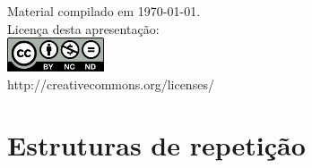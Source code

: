 \documentclass[portuguese,10pt,xcolor=table]{bredelebeamer}
\title{\insertlecture}
\author{Prof. Fernando Figueira\\(adaptado do material do Prof. Rafael Beserra Gomes}
\institute{UFRN}
\date{}
\begin{document}
\begin{frame}
  \maketitle
 \begin{center}
 \tiny
Material compilado em \today.\\
  Licença desta apresentação:\\
		\includegraphics[height=1.0cm]{by-nc-nd.png}\\
http://creativecommons.org/licenses/
	\end{center}
\end{frame}


	\def\GN[#1]{\colorbox{gray!40}{#1}}
	\def\RN[#1]{\colorbox{red!40}{#1}}
	\def\BN[#1]{\colorbox{blue!40}{#1}}
	\def\ON[#1]{\colorbox{orange!40}{#1}}
	\def\WN[#1]{\colorbox{white!40}{#1}}


\section{Estruturas de repetição}

	\begin{frame}[c]
		\begin{center}
			\structure{\large \insertsection}
		\end{center}
	\end{frame} 
	
\end{document}
